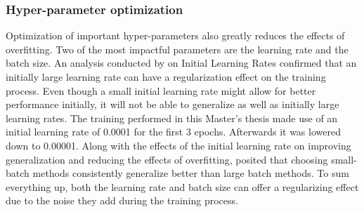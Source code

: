 \subsubsection{Hyper-parameter optimization}
Optimization of important hyper-parameters also greatly reduces the effects of overfitting. Two of the most impactful parameters are the learning rate and the batch size.
\newline\newline
An analysis conducted by \citet{Yuanzhi:2019:RegularizationInitialLargeLearningRate} on Initial Learning Rates confirmed that an initially large learning rate can have a regularization effect on the training process. Even though a small initial learning rate might allow for better performance initially, it will not be able to generalize as well as initially large learning rates. The training performed in this Master's thesis made use of an initial learning rate of 0.0001 for the first 3 epochs. Afterwards it was lowered down to 0.00001.
\newline\newline
Along with the effects of the initial learning rate on improving generalization and reducing the effects of overfitting, \citet{Keskar:2016:LargeBatchTrainingGeneralization} posited that choosing small-batch methods consistently generalize better than large batch methods. 
\newline\newline
To sum everything up, both the learning rate and batch size can offer a regularizing effect due to the noise they add during the training process.
